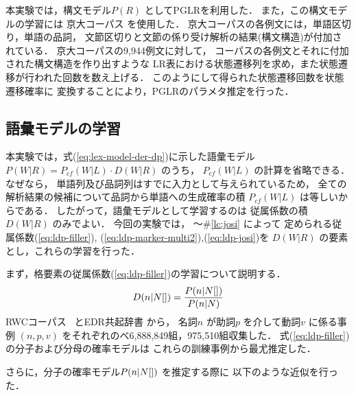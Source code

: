本実験では，構文モデル$P(R)$ としてPGLRを利用した．
また，この構文モデルの学習には
京大コーパス\cite{kurohasi:97:a} を使用した．
京大コーパスの各例文には，単語区切り，単語の品詞，
文節区切りと文節の係り受け解析の結果(構文構造)が付加されている．
京大コーパスの9,944例文に対して，
コーパスの各例文とそれに付加された構文構造を作り出すような
LR表における状態遷移列を求め，また状態遷移が行われた回数を数え上げる．
このようにして得られた状態遷移回数を状態遷移確率に
変換することにより，PGLRのパラメタ推定を行った．
\subsection{語彙モデルの学習}
\label{sec:learn-lex-model}

本実験では，式(\ref{eq:lex-model-der-dp})に示した語彙モデル
$P(W|R)=P_{cf}(W|L) \cdot D(W|R)$ のうち，
$P_{cf}(W|L)$ の計算を省略できる．
なぜなら，
単語列及び品詞列はすでに入力として与えられているため，
全ての解析結果の候補について品詞から単語への生成確率の積
$P_{cf} (W|L)$ は等しいからである．
したがって，語彙モデルとして学習するのは
従属係数の積$D(W|R)$ のみでよい．
今回の実験では，
〜\#\ref{lc:josi} によって
定められる従属係数(\ref{eq:ldp-filler}),
(\ref{eq:ldp-marker-multi2}),(\ref{eq:ldp-josi})を
$D(W|R)$ の要素とし，これらの学習を行った．

まず，格要素の従属係数(\ref{eq:ldp-filler})の学習について説明する．
\begin{equation}
  \label{eq:ldp-filler}
  D(n | N[\slot{v}{p}]) = \frac{P(n|N[\slot{v}{p}])}{P(n|N)}
\end{equation}
RWCコーパス~\cite{rwc:95:a} とEDR共起辞書\cite{edr:95:a} から，
名詞$n$ が助詞$p$ を介して動詞$v$ に係る事例
$(n,p,v)$ をそれぞれのべ6,888,849組，975,510組収集した．
式(\ref{eq:ldp-filler})の分子および分母の確率モデルは
これらの訓練事例から最尤推定した．

さらに，分子の確率モデル$P(n|N[\slot{v}{p}])$ を推定する際に
以下のような近似を行った．

